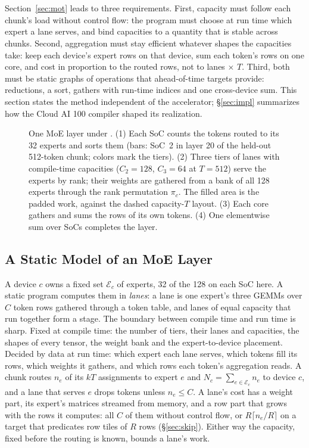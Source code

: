 \section{\sys}
\label{sec:design}

Section~\ref{sec:mot} leads to three requirements. First, capacity must follow each chunk's load without control flow:
the program must choose at run time which expert a lane serves, and bind capacities to a quantity that is stable across
chunks. Second, aggregation must stay efficient whatever shapes the capacities take: keep each device's expert rows on that
device, sum each token's rows on one core, and cost in proportion to the routed rows, not to lanes$\,\times\,T$. Third, both
must be static graphs of operations that ahead-of-time targets provide: reductions, a sort, gathers with run-time indices
and one cross-device sum. This section states the method independent of the accelerator; \S\ref{sec:impl} summarizes how
the Cloud AI 100 compiler shaped its realization.

\begin{figure}[t]
\centering

\vskip -0.05in
\caption{One MoE layer under \sys. (1) Each SoC counts the tokens routed to its 32 experts and sorts them (bars: SoC~2 in
layer 20 of the held-out 512-token chunk; colors mark the tiers). (2) Three tiers of lanes with compile-time capacities
($C_2=128$, $C_3=64$ at $T=512$) serve the experts by rank; their weights are gathered from a bank of all 128 experts
through the rank permutation $\pi_c$. The filled area is the padded work, against the dashed capacity-$T$ layout.
(3) Each core gathers and sums the rows of its own tokens. (4) One elementwise sum over SoCs completes the layer.}
\label{fig:overview}
\vskip -0.1in
\end{figure}

\subsection{A Static Model of an MoE Layer}
\label{sec:model}

A device $c$ owns a fixed set $\mathcal{E}_c$ of experts, 32 of the 128 on each SoC here. A static program computes them in
\emph{lanes}: a lane is one expert's three GEMMs over $C$ token rows gathered through a token table, and lanes of equal
capacity that run together form a stage. The boundary between compile time and run time is
sharp. Fixed at compile time: the number of tiers, their lanes and capacities, the shapes of every tensor, the weight bank
and the expert-to-device placement. Decided by data at run time: which expert each lane serves, which tokens fill its
rows, which weights it gathers, and which rows each token's aggregation reads. A chunk routes $n_e$
of its $kT$ assignments to expert $e$ and $N_c=\sum_{e\in\mathcal{E}_c}n_e$ to device $c$, and a lane that serves $e$ drops
tokens unless $n_e\le C$. A lane's cost has a weight part, its expert's matrices streamed from memory, and a row part
that grows with the rows it computes: all $C$ of them without control flow, or $R\lceil n_e/R\rceil$ on a target that
predicates row tiles of $R$ rows (\S\ref{sec:skip}). Either way the capacity, fixed before the routing is known, bounds a
lane's work.

